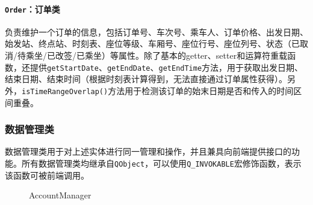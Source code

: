 \documentclass{article}
\begin{document}
				\paragraph{\texttt{Order}：订单类} 负责维护一个订单的信息，包括订单号、车次号、乘车人、订单价格、出发日期、始发站、终点站、时刻表、座位等级、车厢号、座位行号、座位列号、状态（已取消/待乘坐/已改签/已乘坐）等属性。除了基本的getter、setter和运算符重载函数，还提供\texttt{getStartDate}、\texttt{getEndDate}、\texttt{getEndTime}方法，用于获取出发日期、结束日期、结束时间（根据时刻表计算得到，无法直接通过订单属性获得）。另外，\texttt{isTimeRangeOverlap()}方法用于检测该订单的始末日期是否和传入的时间区间重叠。
			
			\subsubsection{数据管理类}
				数据管理类用于对上述实体进行同一管理和操作，并且兼具向前端提供接口的功能。所有数据管理类均继承自\texttt{QObject}，可以使用\texttt{Q\_INVOKABLE}宏修饰函数，表示该函数可被前端调用。
				
				\begin{figure}[H]
					\centering
					
					\caption{AccountManager}
					\label{AccountManager}
				\end{figure}
				
\end{document}
